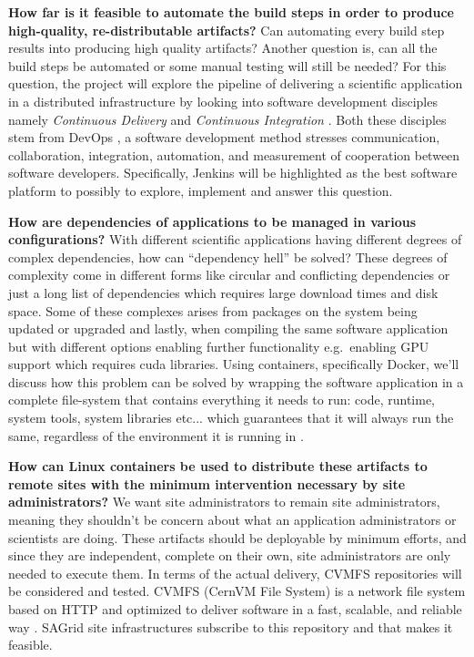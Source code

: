 \documentclass [titlepage,11pt]{article}
\begin{document}
\begin{description}

\item \textbf{How far is it feasible to automate the build steps in order to produce high-quality, re-distributable artifacts?} Can automating every build step results into producing high quality artifacts? Another question is, can all the build steps be automated or some manual testing will still be needed? For this question, the project will explore the pipeline of delivering a scientific application in a distributed infrastructure by looking into software development disciples namely \emph{Continuous Delivery} \cite{delivery15} and \emph{Continuous Integration} \citep{fowler06}. Both these disciples stem from DevOps \citep{wikiOps}, a software development method  stresses communication, collaboration, integration, automation, and measurement of cooperation between software developers. Specifically, Jenkins will be highlighted as the best software platform to possibly to explore, implement and answer this question. \\

\item \textbf{How are dependencies of applications to be managed in various configurations?} With different scientific applications having different degrees of complex dependencies, how can ``dependency hell''\citep{dependency} be solved? These degrees of complexity come in different forms like circular and conflicting dependencies or just a long list of dependencies which requires large download times and disk space. Some of these complexes arises from packages on the system being updated or upgraded and lastly, when compiling the same software application but with different options enabling further functionality e.g.\ enabling GPU support which requires cuda libraries. Using containers, specifically Docker, we'll discuss how this problem can be solved by wrapping the software application in a complete file-system that contains everything it needs to run: code, runtime, system tools, system libraries etc... which guarantees that it will always run the same, regardless of the environment it is running in \citep{dockerWeb}. \\

\item \textbf{How can Linux containers be used to distribute these artifacts to remote sites with the minimum intervention necessary by site administrators?} We want site administrators to remain site administrators, meaning they shouldn't be concern about what an application administrators or scientists are doing. These artifacts should be deployable by minimum efforts, and since they are independent, complete on their own, site administrators are only needed to execute them. In terms of the actual delivery, CVMFS repositories will be considered and tested. CVMFS (CernVM File System) is a network file system based on HTTP and optimized to deliver software in a fast, scalable, and reliable way \citep{jakob11}. SAGrid site infrastructures subscribe to this repository and that makes it feasible.  \\

\end{description}
\end{document}
